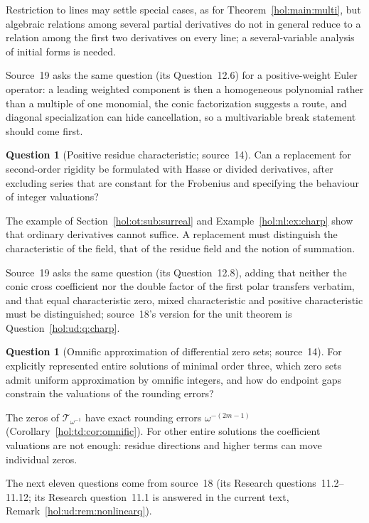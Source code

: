 \documentclass[11pt]{article}
\numberwithin{equation}{section}
\theoremstyle{definition}
\newtheorem{question}[theorem]{Question}
\theoremstyle{remark}
\begin{document}
Restriction to lines may settle special cases, as for
Theorem~\ref{hol:main:multi}, but algebraic relations among several partial
derivatives do not in general reduce to a relation among the first two
derivatives on every line; a several-variable analysis of initial forms is
needed.

Source~19 asks the same question (its Question~12.6) for a positive-weight
Euler operator: a leading weighted component is then a homogeneous polynomial
rather than a multiple of one monomial, the conic factorization suggests a
route, and diagonal specialization can hide cancellation, so a multivariable
break statement should come first.

\begin{question}[Positive residue characteristic; source~14]
\label{hol:ot:q:charp}
Can a replacement for second-order rigidity be formulated with Hasse or
divided derivatives, after excluding series that are constant for the
Frobenius and specifying the behaviour of integer valuations?
\end{question}

The example of Section~\ref{hol:ot:sub:surreal} and
Example~\ref{hol:nl:ex:charp} show that ordinary derivatives cannot suffice.
A replacement must distinguish the characteristic of the field, that of the
residue field and the notion of summation.

Source~19 asks the same question (its Question~12.8), adding that neither the
conic cross coefficient nor the double factor of the first polar transfers
verbatim, and that equal characteristic zero, mixed characteristic and
positive characteristic must be distinguished; source~18's version for the
unit theorem is Question~\ref{hol:ud:q:charp}.

\begin{question}[Omnific approximation of differential zero sets; source~14]
\label{hol:ot:q:omnific}
For explicitly represented entire solutions of minimal order three, which
zero sets admit uniform approximation by omnific integers, and how do endpoint
gaps constrain the valuations of the rounding errors?
\end{question}

The zeros of $\mathcal T_{\omega^{-1}}$ have exact rounding errors
$\omega^{-(2m-1)}$ (Corollary~\ref{hol:td:cor:omnific}). For other entire
solutions the coefficient valuations are not enough: residue directions and
higher terms can move individual zeros.

The next eleven questions come from source~18 (its Research
questions~11.2--11.12; its Research question~11.1 is answered in the current
text, Remark~\ref{hol:ud:rem:nonlinearq}).
\end{document}
